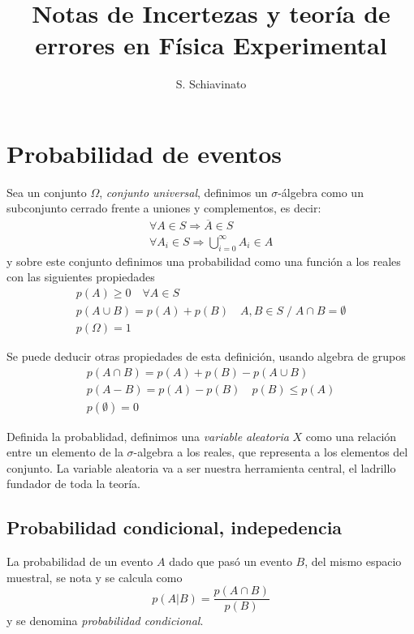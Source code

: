 \documentclass{article}
\title{Notas de Incertezas y teoría de errores en Física Experimental}
\author{S. Schiavinato}
\date{}
\numberwithin{equation}{section} %
\begin{document}
\maketitle
\tableofcontents

\section{Probabilidad de eventos}
Sea un conjunto $\Omega$, \emph{conjunto universal}, definimos un $\sigma$-álgebra como un subconjunto cerrado frente a uniones y complementos, es decir:
\begin{equation}
\begin{gathered}
    \forall A \in S \Rightarrow \overline{A} \in S \\
    \forall A_i \in S \Rightarrow \bigcup_{i=0}^{\infty} A_i \in A
\end{gathered}
\end{equation}
y sobre este conjunto definimos una probabilidad como una función a los reales con las siguientes propiedades
\begin{equation}
\begin{gathered}
p(A) \geq 0 \quad \forall A \in S \\
p(A \cup B) = p(A) + p(B) \quad A, B \in S \;/\; A \cap B = \emptyset \\
p(\Omega) = 1
\end{gathered}
\end{equation}

Se puede deducir otras propiedades de esta definición, usando algebra de grupos
\begin{equation}
\begin{gathered}
p(A \cap B) = p(A) + p(B) - p(A \cup B) \\
p(A - B) = p(A) - p(B) \quad p(B)\leq p(A)\\
p(\emptyset) = 0
\end{gathered}
\end{equation}

Definida la probablidad, definimos una \emph{variable aleatoria} $X$ como una relación entre un elemento de la $\sigma$-algebra a los reales, que representa a los elementos del conjunto. La variable aleatoria va a ser nuestra herramienta central, el ladrillo fundador de toda la teoría.

\subsection{Probabilidad condicional, indepedencia}
La probabilidad de un evento $A$ dado que pasó un evento $B$, del mismo espacio muestral, se nota y se calcula como
\begin{equation}
p(A|B) = \frac{p(A \cap B)}{p(B)}
\end{equation}
y se denomina \emph{probabilidad condicional}.
\end{document}
